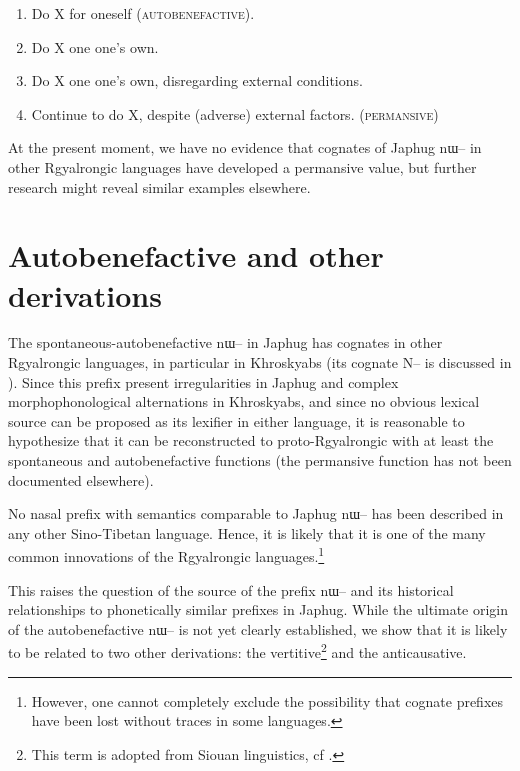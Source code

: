 \documentclass[oldfontcommands,oneside,a4paper,11pt]{article}
\newcommand{\ipa}[1]{{\phon \mbox{#1}}} %
\begin{document}
\begin{enumerate}
\item Do X for oneself (\textsc{autobenefactive}).  
\item Do X one one's own.
\item Do X one one's own, disregarding external conditions.
\item Continue to do X, despite (adverse) external factors. (\textsc{permansive})
\end{enumerate}
 
At the present moment, we have no evidence that cognates of Japhug \ipa{nɯ--} in other Rgyalrongic languages have developed a permansive value, but further research might reveal similar examples elsewhere.


\section{Autobenefactive and other derivations}

The spontaneous-autobenefactive \ipa{nɯ--} in Japhug has cognates in other Rgyalrongic languages, in particular in Khroskyabs (its cognate \ipa{N--} is discussed in \citealt[157-160]{lai13affixale}). Since this prefix present irregularities in Japhug and complex morphophonological alternations in Khroskyabs, and since no obvious lexical source can be proposed as its lexifier in either language, it is reasonable to hypothesize that it can be reconstructed to proto-Rgyalrongic with at least the spontaneous and autobenefactive functions (the permansive function has not been documented elsewhere).


No nasal prefix with semantics comparable to Japhug \ipa{nɯ--} has been described in any other Sino-Tibetan language. Hence, it is likely that it is one of the many common innovations of the Rgyalrongic languages.\footnote{However, one cannot completely exclude the possibility that cognate prefixes have been lost without traces in some languages.} 

This raises the question of the source of the prefix \ipa{nɯ--} and its historical relationships to phonetically similar prefixes in Japhug. While the ultimate origin of the autobenefactive \ipa{nɯ--} is not yet clearly established, we show that it is likely to be related to two other derivations: the vertitive\footnote{This term is adopted from Siouan linguistics, cf \citet{taylor76motion}.} and the anticausative.
\end{document}
